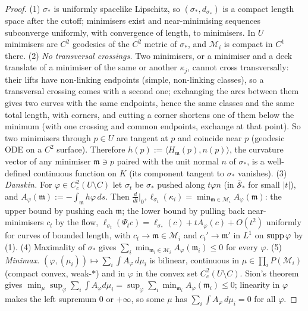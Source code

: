 \documentclass[aps,prd,onecolumn,superscriptaddress,nofootinbib,amsmath,amssymb,11pt]{revtex4-2}
\theoremstyle{definition}
\begin{document}
\begin{proof}
(1) $\sigma_*$ is uniformly spacelike Lipschitz, so $(\sigma_*,d_{\sigma_*})$ is a compact length space after the cutoff; minimisers exist and
near-minimising sequences subconverge uniformly, with convergence of length, to minimisers. In $U$ minimisers are $C^2$ geodesics
of the $C^2$ metric of $\sigma_*$, and $\mathcal M_i$ is compact in $C^1$ there.
(2) \emph{No transversal crossings.} Two minimisers, or a minimiser and a deck translate of a minimiser of the same or another
$\kappa_j$, cannot cross transversally: their lifts have non-linking endpoints (simple, non-linking classes), so a transversal crossing
comes with a second one; exchanging the arcs between them gives two curves with the same endpoints, hence the same classes and the
same total length, with corners, and cutting a corner shortens one of them below the minimum (with one crossing and common
endpoints, exchange at that point). So two minimisers through $p\in U$ are tangent at $p$ and coincide near $p$ (geodesic ODE on a
$C^2$ surface). Therefore $h(p):=\langle H_{\mathfrak m}(p),n(p)\rangle$, the curvature vector of any minimiser $\mathfrak m\ni p$ paired with the
unit normal $n$ of $\sigma_*$, is a well-defined continuous function on $K$ (its component tangent to $\sigma_*$ vanishes).
(3) \emph{Danskin.} For $\varphi\in C^2_c(U\setminus C)$ let $\sigma_t$ be $\sigma_*$ pushed along $t\varphi n$ (in $\bar{\mathcal S}_*$ for small $|t|$),
and $A_\varphi(\mathfrak m):=-\int_{\mathfrak m}h\varphi\,ds$. Then $\frac{d}{dt}|_{0^+}\ell_{\sigma_t}(\kappa_i)=\min_{\mathfrak m\in\mathcal M_i}A_\varphi(\mathfrak m)$: the
upper bound by pushing each $\mathfrak m$; the lower bound by pulling back near-minimisers $c_t$ by the flow,
$\ell_{\sigma_t}(\Psi_tc)=\ell_{\sigma_*}(c)+tA_\varphi(c)+O(t^2)$ uniformly for curves of bounded length, with $c_t\to\mathfrak m\in\mathcal M_i$ and
$c_t'\to\mathfrak m'$ in $L^1$ on ${\rm supp}\,\varphi$ by (1).
(4) Maximality of $\sigma_*$ gives $\sum_i\min_{\mathfrak m_i\in\mathcal M_i}A_\varphi(\mathfrak m_i)\le0$ for every $\varphi$.
(5) \emph{Minimax.} $(\varphi,(\mu_i))\mapsto\sum_i\int A_\varphi\,d\mu_i$ is bilinear, continuous in $\mu\in\prod_iP(\mathcal M_i)$ (compact convex,
weak-$*$) and in $\varphi$ in the convex set $C^2_c(U\setminus C)$. Sion's theorem~\cite{Sion1958} gives
$\min_\mu\sup_\varphi\sum_i\int A_\varphi d\mu_i=\sup_\varphi\sum_i\min_{\mathfrak m_i}A_\varphi(\mathfrak m_i)\le0$; linearity in $\varphi$ makes the left supremum
$0$ or $+\infty$, so some $\mu$ has $\sum_i\int A_\varphi\,d\mu_i=0$ for all $\varphi$.

\end{proof}
\end{document}
